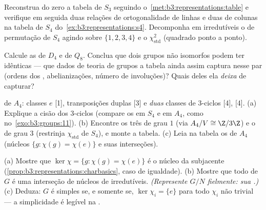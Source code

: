 \begin{exercise}[$\star$]\label{exo:b3:representations:3}
Reconstrua do zero a tabela de $S_3$ seguindo o~\cref{met:b3:representations:table} e
verifique em seguida duas relações de ortogonalidade de linhas e duas
de colunas na tabela de $S_4$ do~\cref{ex:b3:representations:s4}. Decomponha em
irredutíveis o  de permutação de $S_4$ agindo sobre $\{1,2,3,4\}$ e
o  $\chi_{\mathrm{std}}^2$ (quadrado ponto a ponto).
\end{exercise}

\begin{exercise}[$\star\star$]\label{exo:b3:representations:4}
Calcule as  de $D_4$ e de $Q_8$. Conclua
que dois grupos não isomorfos podem ter  idênticas
--- que dados de teoria de grupos a tabela ainda assim captura nesse
par (ordens dos , abelianizações, número de involuções)? Quais
deles ela \emph{deixa} de capturar?
\end{exercise}

\begin{exercise}[$\star\star$]\label{exo:b3:representations:5}
 de $A_4$: classes $e$ [1], transposições
duplas [3] e \emph{duas} classes de $3$-ciclos [4], [4].
(a) Explique a cisão dos $3$-ciclos (compare os  em
$S_4$ e em $A_4$, como no~\cref{exo:b3:groups:11}).
(b) Encontre os três  de grau $1$ (via $A_4/V \cong
\Z/3\Z$) e o 
de grau $3$ (restrinja $\chi_{\mathrm{std}}$ de $S_4$), e monte a tabela.
(c) Leia na tabela os  de $A_4$ (núcleos $\{g : \chi(g) = \chi(e)\}$ e
suas interseções).
\end{exercise}

\begin{exercise}[$\star\star$]\label{exo:b3:representations:6}
(a) Mostre que $\ker\chi = \{g : \chi(g) = \chi(e)\}$ é o núcleo da  subjacente
(\cref{prop:b3:representations:charbasics}, caso de igualdade).
(b) Mostre que todo  de $G$ é uma interseção de
núcleos de  irredutíveis. \emph{(Represente $G/N$
fielmente: sua .)}
(c) Deduza: $G$ é simples se, e somente se, $\ker\chi_i = \{e\}$ para todo
$\chi_i$  não trivial --- a simplicidade é legível na
.
\end{exercise}

